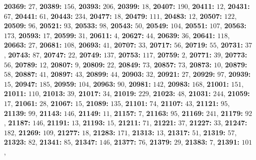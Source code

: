 \textsf{\bfseries 20369:} $27$, \textsf{\bfseries 20389:} $156$, \textsf{\bfseries 20393:} $206$, \textsf{\bfseries 20399:} $18$, \textsf{\bfseries 20407:} $190$, \textsf{\bfseries 20411:} $12$, \textsf{\bfseries 20431:} $67$, \textsf{\bfseries 20441:} $61$, \textsf{\bfseries 20443:} $234$, \textsf{\bfseries 20477:} $18$, \textsf{\bfseries 20479:} $111$, \textsf{\bfseries 20483:} $12$, \textsf{\bfseries 20507:} $122$, \textsf{\bfseries 20509:} $96$, \textsf{\bfseries 20521:} $93$, \textsf{\bfseries 20533:} $98$, \textsf{\bfseries 20543:} $50$, \textsf{\bfseries 20549:} $104$, \textsf{\bfseries 20551:} $107$, \textsf{\bfseries 20563:} $173$, \textsf{\bfseries 20593:} $17$, \textsf{\bfseries 20599:} $31$, \textsf{\bfseries 20611:} $4$, \textsf{\bfseries 20627:} $44$, \textsf{\bfseries 20639:} $36$, \textsf{\bfseries 20641:} $118$, \textsf{\bfseries 20663:} $27$, \textsf{\bfseries 20681:} $108$, \textsf{\bfseries 20693:} $41$, \textsf{\bfseries 20707:} $33$, \textsf{\bfseries 20717:} $56$, \textsf{\bfseries 20719:} $55$, \textsf{\bfseries 20731:} $37$, \textsf{\bfseries 20743:} $87$, \textsf{\bfseries 20747:} $22$, \textsf{\bfseries 20749:} $137$, \textsf{\bfseries 20753:} $117$, \textsf{\bfseries 20759:} $2$, \textsf{\bfseries 20771:} $39$, \textsf{\bfseries 20773:} $56$, \textsf{\bfseries 20789:} $12$, \textsf{\bfseries 20807:} $9$, \textsf{\bfseries 20809:} $22$, \textsf{\bfseries 20849:} $73$, \textsf{\bfseries 20857:} $73$, \textsf{\bfseries 20873:} $10$, \textsf{\bfseries 20879:} $58$, \textsf{\bfseries 20887:} $41$, \textsf{\bfseries 20897:} $43$, \textsf{\bfseries 20899:} $44$, \textsf{\bfseries 20903:} $32$, \textsf{\bfseries 20921:} $27$, \textsf{\bfseries 20929:} $97$, \textsf{\bfseries 20939:} $15$, \textsf{\bfseries 20947:} $185$, \textsf{\bfseries 20959:} $104$, \textsf{\bfseries 20963:} $90$, \textsf{\bfseries 20981:} $142$, \textsf{\bfseries 20983:} $168$, \textsf{\bfseries 21001:} $151$, \textsf{\bfseries 21011:} $110$, \textsf{\bfseries 21013:} $39$, \textsf{\bfseries 21017:} $34$, \textsf{\bfseries 21019:} $229$, \textsf{\bfseries 21023:} $48$, \textsf{\bfseries 21031:} $244$, \textsf{\bfseries 21059:} $17$, \textsf{\bfseries 21061:} $28$, \textsf{\bfseries 21067:} $15$, \textsf{\bfseries 21089:} $135$, \textsf{\bfseries 21101:} $74$, \textsf{\bfseries 21107:} $43$, \textsf{\bfseries 21121:} $95$, \textsf{\bfseries 21139:} $99$, \textsf{\bfseries 21143:} $146$, \textsf{\bfseries 21149:} $11$, \textsf{\bfseries 21157:} $7$, \textsf{\bfseries 21163:} $95$, \textsf{\bfseries 21169:} $241$, \textsf{\bfseries 21179:} $92$, \textsf{\bfseries 21187:} $146$, \textsf{\bfseries 21191:} $13$, \textsf{\bfseries 21193:} $15$, \textsf{\bfseries 21211:} $71$, \textsf{\bfseries 21221:} $37$, \textsf{\bfseries 21227:} $33$, \textsf{\bfseries 21247:} $182$, \textsf{\bfseries 21269:} $109$, \textsf{\bfseries 21277:} $18$, \textsf{\bfseries 21283:} $171$, \textsf{\bfseries 21313:} $13$, \textsf{\bfseries 21317:} $51$, \textsf{\bfseries 21319:} $57$, \textsf{\bfseries 21323:} $82$, \textsf{\bfseries 21341:} $85$, \textsf{\bfseries 21347:} $146$, \textsf{\bfseries 21377:} $76$, \textsf{\bfseries 21379:} $29$, \textsf{\bfseries 21383:} $7$, \textsf{\bfseries 21391:} $101$, 
